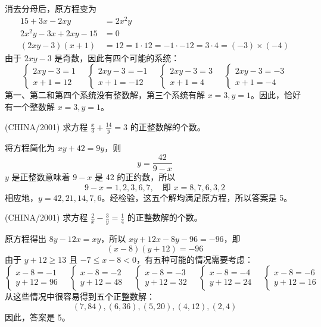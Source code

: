 \begin{questions}
\begin{solution}
消去分母后，原方程变为
\begin{align*}
15+3x-2xy &= 2x^2y \\
2x^2y-3x+2xy-15 &= 0 \\
(2xy-3)(x+1) &= 12 = 1 \cdot 12 = -1 \cdot -12 = 3 \cdot 4 = (-3) \times (-4)
\end{align*}
由于 $2xy-3$ 是奇数，因此有四个可能的系统：
\[
\begin{cases} 2xy-3=1 \\ x+1=12 \end{cases} \quad \begin{cases} 2xy-3=-1 \\ x+1=-12 \end{cases} \quad \begin{cases} 2xy-3=3 \\ x+1=4 \end{cases} \quad \begin{cases} 2xy-3=-3 \\ x+1=-4 \end{cases}
\]
第一、第二和第四个系统没有整数解，第三个系统有解 $x=3, y=1$。因此，恰好有一个整数解 $x=3, y=1$。
\end{solution}

\question (CHINA/2001) 求方程 $\frac{x}{3}+\frac{14}{y}=3$ 的正整数解的个数。

\begin{solution}
将方程简化为 $xy+42=9y$，则
\[
y=\frac{42}{9-x}
\]
$y$ 是正整数意味着 $9-x$ 是 42 的正约数，所以
\[
9-x=1, 2, 3, 6, 7, \quad \text{即 } x=8, 7, 6, 3, 2
\]
相应地，$y=42, 21, 14, 7, 6$。经检验，这五个解均满足原方程，所以答案是 5。
\end{solution}

\question (CHINA/2001) 求方程 $\frac{2}{x}-\frac{3}{y}=\frac{1}{4}$ 的正整数解的个数。

\begin{solution}
原方程得出 $8y-12x=xy$，所以 $xy+12x-8y-96=-96$，即
\[
(x-8)(y+12)=-96
\]
由于 $y+12 \ge 13$ 且 $-7 \le x-8 < 0$，有五种可能的情况需要考虑：
\[
\begin{cases} x-8=-1 \\ y+12=96 \end{cases} \quad \begin{cases} x-8=-2 \\ y+12=48 \end{cases} \quad \begin{cases} x-8=-3 \\ y+12=32 \end{cases} \quad \begin{cases} x-8=-4 \\ y+12=24 \end{cases} \quad \begin{cases} x-8=-6 \\ y+12=16 \end{cases}
\]
从这些情况中很容易得到五个正整数解：
\[
(7,84), (6,36), (5,20), (4,12), (2,4)
\]
因此，答案是 5。
\end{solution}


\end{questions}
